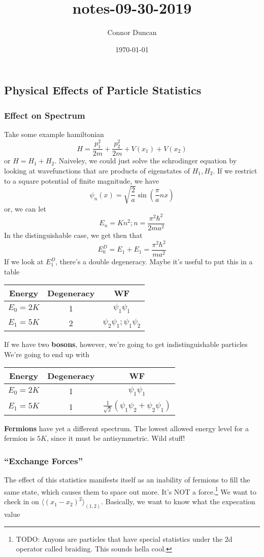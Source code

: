 \documentclass{article}
\author{Connor Duncan}
\date{\today}
\title{notes-09-30-2019}
\theoremstyle{definition}
\begin{document}
\subsection{Physical Effects of Particle Statistics} \subsubsection{Effect on Spectrum} Take some example hamiltonian \begin{equation} H=\frac{p_1^2}{2m}+\frac{p^2_2}{2m}+V(x_1)+V(x_2) \end{equation} or $H=H_1+H_2$. Naiveley, we could just solve the schrodinger equation by looking at wavefunctions that are products of eigenstates of $H_1,H_2$. If we restrict to a square potential of finite magnitude, we have \begin{equation} \psi_n(x)=\sqrt{\frac{2}{a}}\sin(\frac{\pi}{a}nx) \end{equation} or, we can let \begin{equation} E_n=Kn^2;n=\frac{\pi^2\hbar^2}{2ma^2} \end{equation} In the distinguishable case, we get then that \begin{equation} E_0^D=E_1+E_1=\frac{\pi^2\hbar^2}{ma^2} \end{equation} If we look at $E_1^D$, there's a double degeneracy. Maybe it's useful to put this in a table \begin{center} \begin{tabular}{c|c|c} Energy & Degeneracy & WF\\ \hline $E_0=2K$& 1 & $\psi_1\psi_1$\\ $E_1=5K$& 2 & $\psi_2\psi_1;\psi_1\psi_2$ \end{tabular} \end{center} If we have two \textbf{bosons}, however, we're going to get indistinguishable particles We're going to end up with \begin{center} \begin{tabular}{c|c|c} Energy & Degeneracy & WF\\ \hline $E_0=2K$& 1 & $\psi_1\psi_1$\\ $E_1=5K$& 1 & $\frac{1}{\sqrt{2}}(\psi_1\psi_2+\psi_2\psi_1)$ \end{tabular} \end{center} \textbf{Fermions} have yet a different spectrum. The lowest allowed energy level for a fermion is $5K$, since it must be antisymmetric. Wild stuff! \subsubsection{``Exchange Forces''} The effect of this statistics manifests itself as an inability of fermions to fill the same state, which causes them to space out more. It's NOT a force.\footnote{TODO: Anyons are particles that have special statistics under the 2d operator called braiding. This sounds hella cool.} We want to check in on $\langle(x_1-x_2)^2\rangle_{(1,2)}$. Basically, we want to know what the expecation value 
\end{document}
